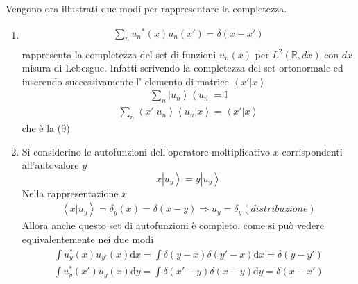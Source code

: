 Vengono ora illustrati due modi per rappresentare la completezza.
  \begin{enumerate}
 \item \begin{equation}\begin{split}
\sum_n{u_n}^*\left(x\right)u_n\left(x'\right)=\delta\left(x-x'\right) \\
 \end{split}\end{equation}
rappresenta la completezza del set di funzioni $u_n(x)$ per $L^2\left(\mathbb{R} ,dx\right)$ con $dx$ misura di Lebesgue.
Infatti scrivendo la completezza del set ortonormale ed inserendo successivamente l' elemento di matrice $\left\langle x'|x \right\rangle$
 \begin{equation}\begin{split}
\sum_n{\left |u_n \right\rangle\left\langle u_n\right |}=\mathbb{I}
 \end{split}\end{equation}
\begin{equation}\begin{split}
\sum_n{\left\langle x'|u_n \right\rangle\left\langle u_n|x \right\rangle}=\left\langle x'|x \right\rangle 
\end{split}\end{equation}
che è la (9)
\item
Si considerino le autofunzioni dell'operatore  moltiplicativo $x$ corrispondenti all'autovalore $y$ 
 \begin{equation}
x\left |u_y \right\rangle=y\left |u_y \right\rangle
 \end{equation}
Nella rappresentazione $x$
 \begin{equation}\begin{split}
\left\langle x|u_y \right\rangle=\delta_y\left(x\right)=\delta(x-y) \Longrightarrow u_y=\delta_y (distribuzione)
\end{split}\end{equation}
Allora anche questo set di autofunzioni è completo, come si può vedere equivalentemente nei due modi
 \begin{equation}\begin{split}
\int{u^*_y\left(x\right)u_{y'}\left(x\right)\textrm{d}x}
=\int{\delta(y-x)\delta(y'-x)\textrm{d}x}=
\delta\left(y-y'\right)
 \end{split}\end{equation}
 \begin{equation}\begin{split}
\int{u^*_y\left(x'\right)u_{y}\left(x\right)\textrm{d}y}
=\int{\delta(x'-y)\delta(x-y)\textrm{d}y}=
\delta\left(x-x'\right)
 \end{split}\end{equation}
  \end{enumerate}
